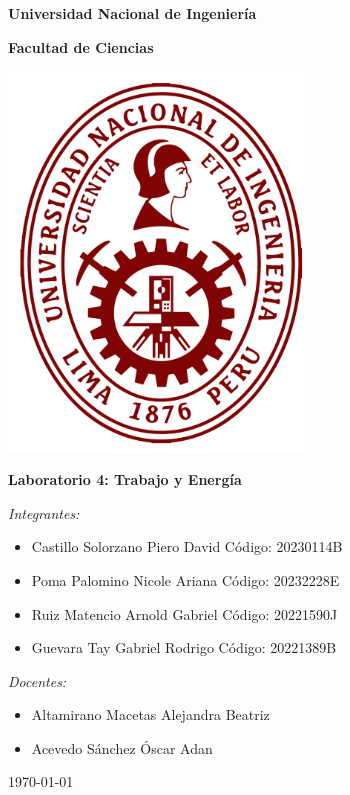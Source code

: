 \documentclass[../main.tex]{subfiles}
\begin{document}
\onecolumn

\begin{center}
\textbf{\fontsize{14}{\baselineskip}\selectfont Universidad Nacional de Ingeniería}

\bigskip

\textbf{\fontsize{14}{\baselineskip}\selectfont Facultad de Ciencias}

\bigskip

\includegraphics[width=8cm]{images/uni_logo.png}

\bigskip

\textbf{\fontsize{20}{\baselineskip}\selectfont Laboratorio 4: Trabajo y Energía}

\bigskip

\textit{\fontsize{14}{\baselineskip}\selectfont Integrantes:}

\begin{itemize}{}
    \item \fontsize{14}{\baselineskip}\selectfont Castillo Solorzano Piero David Código: 20230114B
    \item \fontsize{14}{\baselineskip}\selectfont Poma Palomino Nicole Ariana   Código: 20232228E
    \item \fontsize{14}{\baselineskip}\selectfont Ruiz Matencio Arnold Gabriel   Código: 20221590J
    \item \fontsize{14}{\baselineskip}\selectfont Guevara Tay Gabriel Rodrigo   Código: 20221389B
\end{itemize}

\textit{\fontsize{14}{\baselineskip}\selectfont Docentes:}

\begin{itemize}
    \item \fontsize{14}{\baselineskip}\selectfont Altamirano Macetas Alejandra Beatriz
    \item \fontsize{14}{\baselineskip}\selectfont Acevedo Sánchez Óscar Adan
\end{itemize}

\bigskip

{\today}
\end{center}

\clearpage
\end{document}
